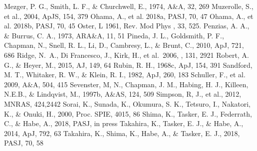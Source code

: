 \documentclass[onecolumn]{pasj01}
\begin{document}
{{{{{{\begin{thebibliography}{}
Mezger, P. G., Smith, L. F., \& Churchwell, E., 1974, A\&A, 32, 269
{Muzerolle, S., et al., 2004, ApJS, 154, 379}
Ohama, A., et al. 2018a, PASJ, 70, 47
Ohama, A., et al. 2018b, PASJ, 70, 45
Oster, L 1961, Rev. Mod Phys , 33, 525.
{ Penzias, A. A., \& Burrus, C. A., 1973, ARA\&A, 11, 51}
Pineda, J. L., Goldsmith, P. F., Chapman, N., Snell, R. L., Li, D., Cambresy, L., \& Brunt, C., 2010, ApJ, 721, 686 
Ridge, N.~A., Di Francesco, J., Kirk, H., et al.\ 2006, \aj, 131, 2921 
{Robert, A. G., \& Heyer, M., 2015, AJ, 149, 64}
Rubin, R. H., 1968c, ApJ, 154, 391
Sandford, M. T., Whitaker, R. W., \& Klein, R. I., 1982, ApJ, 260, 183
Schuller, F., et al. 2009, A\&A, 504, 415
Sevenster, M, N., Chapman, J. M., Habing, H. J., Killeen, N.E.B., \& Lindqvist, M., 1997b, A\&AS, 124, 509
Simpson, R, J., et al., 2012, MNRAS, 424,2442
Sorai, K., Sunada, K., Okumura, S. K., Tetsuro, I., Nakatori, K., \& Onuki, H., 2000, Proc. SPIE, 4015, 86
Shima, K., Tasker, E. J., Federrath, C., \& Habe, A., 2018, PASJ, in press  
Takahira, K., Tasker, E. J., \& Habe, A., 2014, ApJ, 792, 63  
Takahira, K., Shima, K., Habe, A., \& Tasker, E. J., 2018, PASJ, 70, 58  

\end{thebibliography}}}}}}}
\end{document}

